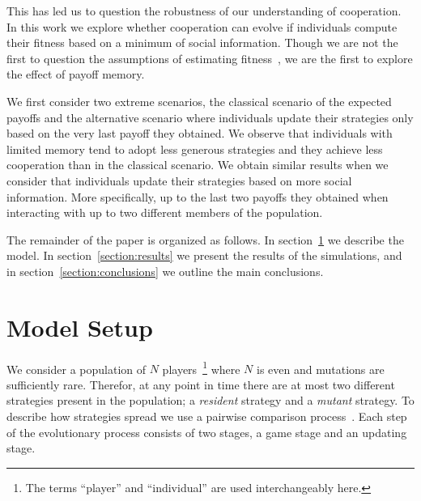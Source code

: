 \documentclass[11pt]{article}
\theoremstyle{plainCl1}
\theoremstyle{plainCl2}
\begin{document}
This has led us to question the robustness of our understanding of cooperation.
In this work we explore whether cooperation can evolve if individuals compute
their fitness based on a minimum of social information. Though we are not the
first to question the assumptions of estimating fitness~\cite{Roca2006}, we are
the first to explore the effect of payoff memory. %

We first consider two extreme scenarios, the classical scenario of the expected
payoffs and the alternative scenario where individuals update their strategies
only based on the very last payoff they obtained. We observe that individuals
with limited memory tend to adopt less generous strategies and they achieve less
cooperation than in the classical scenario. We obtain similar results when we
consider that individuals update their strategies based on more social
information. More specifically, up to the last two payoffs they obtained when
interacting with up to two different members of the population.

The remainder of the paper is organized as follows. In
section~\ref{section:model} we describe the model. In
section~\ref{section:results} we present the results of the simulations, and
in section~\ref{section:conclusions} we outline the main conclusions.

\section{Model Setup}\label{section:model}

We consider a population of \(N\) players~\footnote{The terms ``player'' and
``individual'' are used interchangeably here.} where \(N\) is even and mutations
are sufficiently rare. Therefor, at any point in time there are at most two
different strategies present in the population; a \textit{resident} strategy and
a \textit{mutant} strategy. To describe how strategies spread we use a pairwise
comparison process~\cite{Traulsen2006}.
Each step of the evolutionary process consists of two
stages, a game stage and an updating stage.
\end{document}
